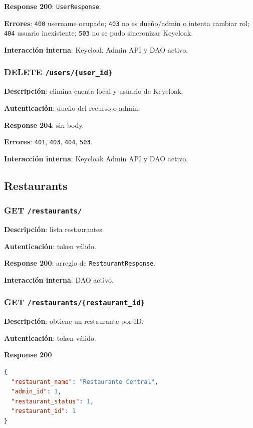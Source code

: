 \documentclass[12pt,letterpaper]{article}
\def\codefile#1{\nolinkurl{#1}}
\def\methodget{\textbf{\color{blue!60!black}GET}}
\def\methoddelete{\textbf{\color{red!70!black}DELETE}}
\begin{document}
\textbf{Response 200}: \codefile{UserResponse}.

\textbf{Errores}: \codefile{400} username ocupado; \codefile{403} no es dueño/admin o intenta cambiar rol; \codefile{404} usuario inexistente; \codefile{503} no se pudo sincronizar Keycloak.

\textbf{Interacción interna}: Keycloak Admin API y DAO activo.

\subsubsection{\methoddelete{} \codefile{/users/{user_id}}}

\textbf{Descripción}: elimina cuenta local y usuario de Keycloak.

\textbf{Autenticación}: dueño del recurso o admin.

\textbf{Response 204}: sin body.

\textbf{Errores}: \codefile{401}, \codefile{403}, \codefile{404}, \codefile{503}.

\textbf{Interacción interna}: Keycloak Admin API y DAO activo.

\subsection{Restaurants}

\subsubsection{\methodget{} \codefile{/restaurants/}}

\textbf{Descripción}: lista restaurantes.

\textbf{Autenticación}: token válido.

\textbf{Response 200}: arreglo de \codefile{RestaurantResponse}.

\textbf{Interacción interna}: DAO activo.

\subsubsection{\methodget{} \codefile{/restaurants/{restaurant_id}}}

\textbf{Descripción}: obtiene un restaurante por ID.

\textbf{Autenticación}: token válido.

\textbf{Response 200}
\begin{lstlisting}[language=json]
{
  "restaurant_name": "Restaurante Central",
  "admin_id": 1,
  "restaurant_status": 1,
  "restaurant_id": 1
}
\end{lstlisting}
\end{document}
